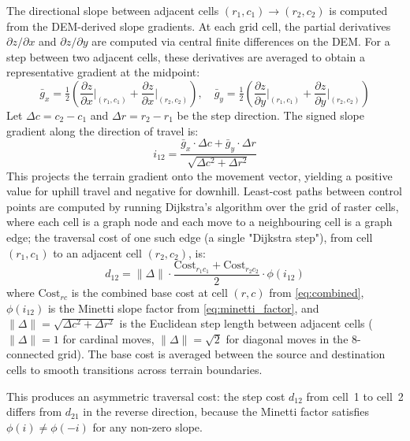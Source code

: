 \documentclass[11pt,a4paper]{article}
\begin{document}
The directional slope between adjacent cells $(r_1, c_1) \to (r_2, c_2)$ is computed from the DEM-derived slope gradients.
At each grid cell, the partial derivatives $\partial z / \partial x$ and $\partial z / \partial y$ are computed via central finite differences on the DEM.
For a step between two adjacent cells, these derivatives are averaged to obtain a representative gradient at the midpoint:
\begin{equation}
  \bar{g}_x = \tfrac{1}{2}\!\left(\frac{\partial z}{\partial x}\bigg|_{(r_1,c_1)} + \frac{\partial z}{\partial x}\bigg|_{(r_2,c_2)}\right), \quad
  \bar{g}_y = \tfrac{1}{2}\!\left(\frac{\partial z}{\partial y}\bigg|_{(r_1,c_1)} + \frac{\partial z}{\partial y}\bigg|_{(r_2,c_2)}\right)
  \label{eq:gradavg}
\end{equation}
Let $\Delta c = c_2 - c_1$ and $\Delta r = r_2 - r_1$ be the step direction.
The signed slope gradient along the direction of travel is:
\begin{equation}
  i_{12} = \frac{\bar{g}_x \cdot \Delta c + \bar{g}_y \cdot \Delta r}{\sqrt{\Delta c^2 + \Delta r^2}}
  \label{eq:dirslope}
\end{equation}
This projects the terrain gradient onto the movement vector, yielding a positive value for uphill travel and negative for downhill.
Least-cost paths between control points are computed by running Dijkstra's algorithm over the grid of raster cells, where each cell is a graph node and each move to a neighbouring cell is a graph edge; the traversal cost of one such edge (a single "Dijkstra step"), from cell $(r_1, c_1)$ to an adjacent cell $(r_2, c_2)$, is:
\begin{equation}
  d_{12} = \|\Delta\| \cdot \frac{\text{Cost}_{r_1 c_1} + \text{Cost}_{r_2 c_2}}{2} \cdot \phi(i_{12})
  \label{eq:edgecost}
\end{equation}
where $\text{Cost}_{rc}$ is the combined base cost at cell $(r,c)$ from \cref{eq:combined}, $\phi(i_{12})$ is the Minetti slope factor from \cref{eq:minetti_factor}, and $\|\Delta\| = \sqrt{\Delta c^2 + \Delta r^2}$ is the Euclidean step length between adjacent cells ($\|\Delta\| = 1$ for cardinal moves, $\|\Delta\| = \sqrt{2}$ for diagonal moves in the 8-connected grid).
The base cost is averaged between the source and destination cells to smooth transitions across terrain boundaries.

This produces an asymmetric traversal cost: the step cost $d_{12}$ from cell~1 to cell~2 differs from $d_{21}$ in the reverse direction, because the Minetti factor satisfies $\phi(i) \neq \phi(-i)$ for any non-zero slope.
\end{document}
